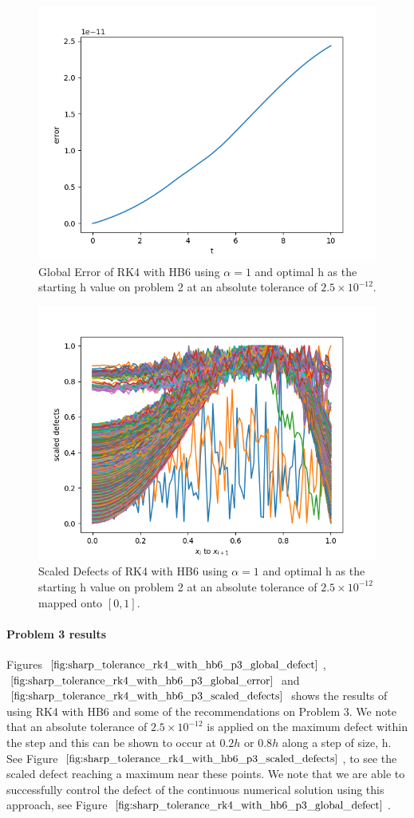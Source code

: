 \begin{figure}[H]
\centering
\includegraphics[width=0.7\linewidth]{./figures/sharp_tolerance_rk4_with_hb6_p2_global_error}
\caption{Global Error of RK4 with HB6 using $\alpha = 1$ and optimal h as the starting h value on problem 2 at an absolute tolerance of $2.5 \times 10^{-12}$.}
\label{fig:sharp_tolerance_rk4_with_hb6_p2_global_error}
\end{figure}

\begin{figure}[H]
\centering
\includegraphics[width=0.7\linewidth]{./figures/sharp_tolerance_rk4_with_hb6_p2_scaled_defects}
\caption{Scaled Defects of RK4 with HB6 using $\alpha = 1$ and optimal h as the starting h value on problem 2 at an absolute tolerance of $2.5 \times 10^{-12}$ mapped onto $[0, 1]$.}
\label{fig:sharp_tolerance_rk4_with_hb6_p2_scaled_defects}
\end{figure}

\paragraph{Problem 3 results}
Figures $\ref{fig:sharp_tolerance_rk4_with_hb6_p3_global_defect}$, $\ref{fig:sharp_tolerance_rk4_with_hb6_p3_global_error}$ and $\ref{fig:sharp_tolerance_rk4_with_hb6_p3_scaled_defects}$ shows the results of using RK4 with HB6 and some of the recommendations on Problem 3. We note that an absolute tolerance of $2.5 \times 10^{-12}$ is applied on the maximum defect within the step and this can be shown to occur at $0.2h$ or $0.8h$ along a step of size, h. See Figure $\ref{fig:sharp_tolerance_rk4_with_hb6_p3_scaled_defects}$, to see the scaled defect reaching a maximum near these points. We note that we are able to successfully control the defect of the continuous numerical solution using this approach, see Figure $\ref{fig:sharp_tolerance_rk4_with_hb6_p3_global_defect}$. 


